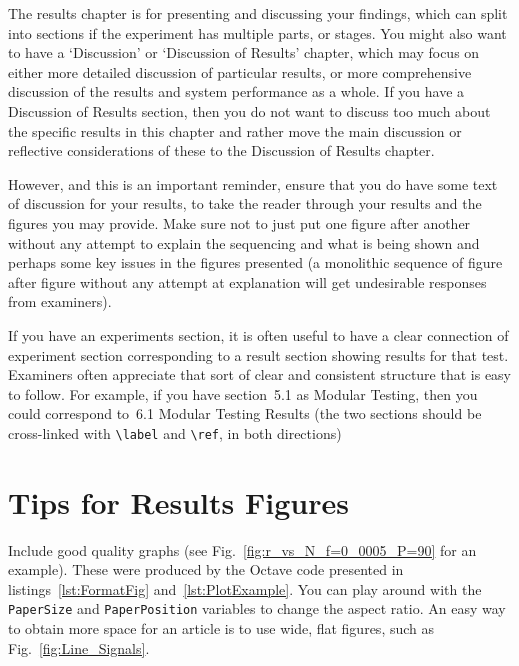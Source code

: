 \label{Ch:Results}

The results chapter is for presenting and discussing your findings, which can split into sections if the experiment has multiple parts, or stages.  You might also want to have a `Discussion' or `Discussion of Results' chapter, which may focus on either more detailed discussion of particular results, or more comprehensive discussion of the results and system performance as a whole.  If you have a Discussion of Results section, then you do not want to discuss too much about the specific results in this chapter and rather move the main discussion or reflective considerations of these to the Discussion of Results chapter.

However, and this is an important reminder, ensure that you do have some text of discussion for your results, to take the reader through your results and the figures you may provide.  Make sure not to just put one figure after another without any attempt to explain the sequencing and what is being shown and perhaps some key issues in the figures presented (a monolithic sequence of figure after figure without any attempt at explanation will get undesirable responses from examiners).

If you have an experiments section, it is often useful to have a clear connection of experiment section corresponding to a result section showing results for that test. Examiners often appreciate that sort of clear and consistent structure that is easy to follow.  For example, if you have section~5.1 as Modular Testing, then you could correspond to~6.1 Modular Testing Results (the two sections should be cross-linked with \verb|\label| and \verb|\ref|, in both directions)

\section{Tips for Results Figures}

Include good quality graphs (see Fig.~\ref{fig:r_vs_N_f=0_0005_P=90} for an example).  These were produced by the Octave code presented in listings~\ref{lst:FormatFig} and~\ref{lst:PlotExample}.  You can play around with the \texttt{PaperSize} and \texttt{PaperPosition} variables to change the aspect ratio.  An easy way to obtain more space for an article is to use wide, flat figures, such as Fig.~\ref{fig:Line_Signals}.


